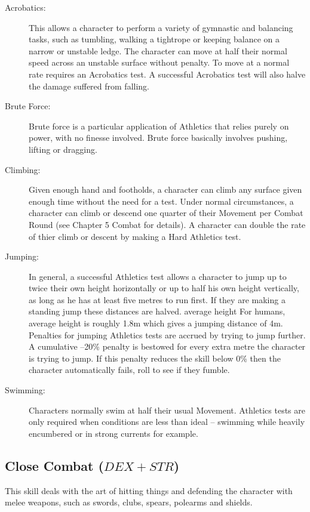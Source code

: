 \begin{description}
	\item[Acrobatics:] This allows a character to perform a variety of gymnastic and balancing tasks, such as tumbling, walking a tightrope or keeping balance on a narrow or unstable ledge. The character can move at half their normal speed across an unstable surface without penalty. To move at a normal rate requires an Acrobatics test. A successful Acrobatics test will also halve the damage suffered from falling. 

	\item[Brute Force:] Brute force is a particular application of Athletics that relies purely on power, with no finesse involved. Brute force basically involves pushing, lifting or dragging. 

	\item[Climbing:] Given enough hand and footholds, a character can climb any surface given enough time without the need for a test. Under normal circumstances, a character can climb or descend one quarter of their Movement per Combat Round (see Chapter 5 Combat for details). A character can double the rate of thier climb or descent by making a Hard Athletics test. 

	\item[Jumping:] In general, a successful Athletics test allows a character to jump up to twice their own height horizontally or up to half his own height vertically, as long as he has at least five metres to run first. If they are making a standing jump these distances are halved. average height For humans, average height is roughly 1.8m which gives a jumping distance of 4m. Penalties for jumping Athletics tests are accrued by trying to jump further. A cumulative –20\% penalty is bestowed for every extra metre the character is trying to jump. If this penalty reduces the skill below 0\% then the character automatically fails, roll to see if they fumble.

	\item[Swimming:] Characters normally swim at half their usual Movement. Athletics tests are only required when conditions are less than ideal – swimming while heavily encumbered or in strong currents for example. 
\end{description}

\subsection{Close Combat ($DEX+STR$)}
This skill deals with the art of hitting things and defending the character with melee weapons, such as swords, clubs, spears, polearms and shields.

